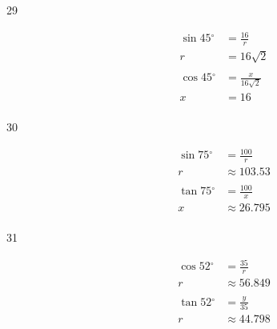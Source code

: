 \documentclass{exam}
\newcommand{\dg}{\ensuremath{^\circ}}
\begin{document}
\begin{description}
  
      \item[29]
        \begin{align*}
          \sin 45 \dg & = \frac{16}{r} \\
          r           & = \boxed{ 16 \sqrt{2} } \\
          \\
          \cos 45 \dg & = \frac{x}{16 \sqrt{2}} \\
          x           & = \boxed{ 16 } \\
        \end{align*}

      \item[30]
        \begin{align*}
          \sin 75 \dg & = \frac{100}{r} \\
          r           & \approx \boxed{ 103.53 } \\
          \\
          \tan 75 \dg & = \frac{100}{x} \\
          x           & \approx \boxed{ 26.795 } \\
        \end{align*}

      \item[31]
        \begin{align*}
          \cos 52 \dg & = \frac{35}{r} \\
          r           & \approx \boxed{ 56.849 } \\
          \\
          \tan 52 \dg & = \frac{y}{35} \\
          r           & \approx \boxed{ 44.798 } \\
        \end{align*}


\end{description}
\end{document}
